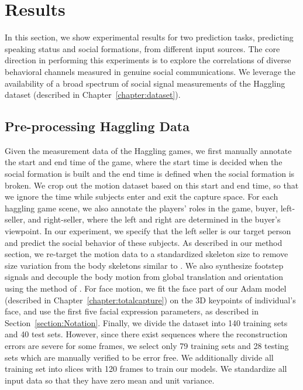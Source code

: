
\section{Results}
In this section, we show experimental results for two prediction tasks, predicting speaking status and social formations, from different input sources. The core direction in performing this experiments is to explore the correlations of diverse behavioral channels measured in genuine social communications. We leverage the availability of a broad spectrum of social signal measurements of the Haggling dataset (described in Chapter~\ref{chapter:dataset}).

\subsection{Pre-processing Haggling Data}
Given the measurement data of the Haggling games, we first manually annotate the start and end time of the game, where the start time is decided when the social formation is built and the end time is defined when the social formation is broken. We crop out the motion dataset based on this start and end time, so that we ignore the time while subjects enter and exit the capture space. For each haggling game scene, we also annotate the players' roles in the game, buyer, left-seller, and right-seller, where the left and right are determined in the buyer's viewpoint. In our experiment, we specify that the left seller is our target person and predict the social behavior of these subjects. As described in our method section, we re-target the motion data to a standardized skeleton size to remove size variation from the body skeletons similar to \cite{holden2016deep}. We also synthesize footstep signals and decouple the body motion from global translation and orientation using the method of \cite{holden2016deep}. For face motion, we fit the face part of our Adam model (described in Chapter~\ref{chapter:totalcapture}) on the 3D keypoints of individual's face, and use the first five facial expression parameters, as described in Section~\ref{section:Notation}. Finally, we divide the dataset into 140 training sets and 40 test sets. However, since there exist sequences where the reconstruction errors are severe for some frames, we select only 79 training sets and 28 testing sets which are manually verified to be error free. We additionally divide all training set into slices with 120 frames to train our models. We standardize all input data so that they have zero mean and unit variance.



